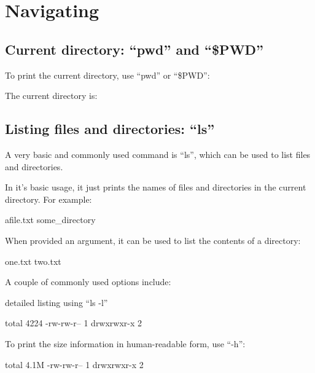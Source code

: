 \chapter{Navigating}

\section{Current directory: ``pwd'' and ``\$PWD''}

To print the current directory, use ``pwd'' or ``\$PWD'':
\begin{prompt}
The current directory is: %
\end{prompt}

\section{Listing files and directories: ``ls''}

A very basic and commonly used command is ``ls'', which can be used to list files and directories.

In it's basic usage, it just prints the names of files and directories in the current directory. For example:

\begin{prompt}
afile.txt   some_directory
\end{prompt}

When provided an argument, it can be used to list the contents of a directory:

\begin{prompt}
one.txt  two.txt
\end{prompt}

A couple of commonly used options include:

\item detailed listing using ``ls -l''

\begin{prompt}
total 4224
-rw-rw-r-- 1 %
drwxrwxr-x 2 %
\end{prompt}

To print the size information in human-readable form, use ``-h'':

\begin{prompt}
total 4.1M
-rw-rw-r-- 1 %
drwxrwxr-x 2 %
\end{prompt}

